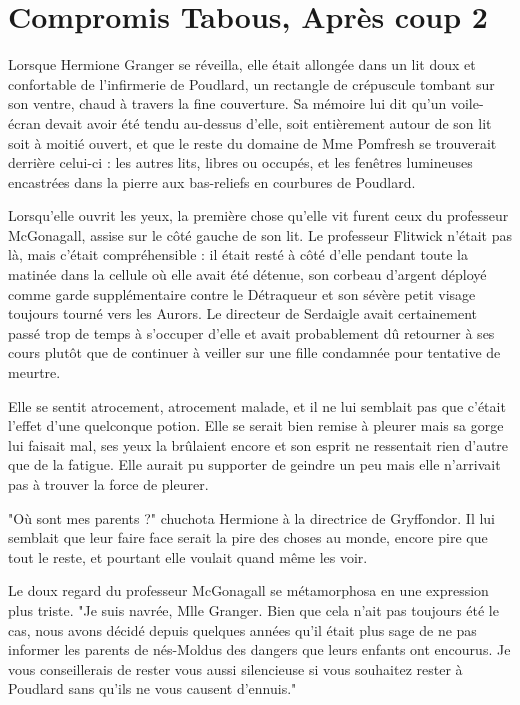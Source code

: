 
\chapter{Compromis Tabous, Après coup 2}

Lorsque Hermione Granger se réveilla, elle était allongée dans un lit doux et confortable de l'infirmerie de Poudlard, un rectangle de crépuscule tombant sur son ventre, chaud à travers la fine couverture. Sa mémoire lui dit qu'un voile-écran devait avoir été tendu au-dessus d'elle, soit entièrement autour de son lit soit à moitié ouvert, et que le reste du domaine de Mme Pomfresh se trouverait derrière celui-ci : les autres lits, libres ou occupés, et les fenêtres lumineuses encastrées dans la pierre aux bas-reliefs en courbures de Poudlard.

Lorsqu'elle ouvrit les yeux, la première chose qu'elle vit furent ceux du professeur McGonagall, assise sur le côté gauche de son lit. Le professeur Flitwick n'était pas là, mais c'était compréhensible : il était resté à côté d'elle pendant toute la matinée dans la cellule où elle avait été détenue, son corbeau d'argent déployé comme garde supplémentaire contre le Détraqueur et son sévère petit visage toujours tourné vers les Aurors. Le directeur de Serdaigle avait certainement passé trop de temps à s'occuper d'elle et avait probablement dû retourner à ses cours plutôt que de continuer à veiller sur une fille condamnée pour tentative de meurtre.

Elle se sentit atrocement, atrocement malade, et il ne lui semblait pas que c'était l'effet d'une quelconque potion. Elle se serait bien remise à pleurer mais sa gorge lui faisait mal, ses yeux la brûlaient encore et son esprit ne ressentait rien d'autre que de la fatigue. Elle aurait pu supporter de geindre un peu mais elle n'arrivait pas à trouver la force de pleurer.

"Où sont mes parents ?" chuchota Hermione à la directrice de Gryffondor. Il lui semblait que leur faire face serait la pire des choses au monde, encore pire que tout le reste, et pourtant elle voulait quand même les voir.

Le doux regard du professeur McGonagall se métamorphosa en une expression plus triste. "Je suis navrée, Mlle Granger. Bien que cela n'ait pas toujours été le cas, nous avons décidé depuis quelques années qu'il était plus sage de ne pas informer les parents de nés-Moldus des dangers que leurs enfants ont encourus. Je vous conseillerais de rester vous aussi silencieuse si vous souhaitez rester à Poudlard sans qu'ils ne vous causent d'ennuis."


